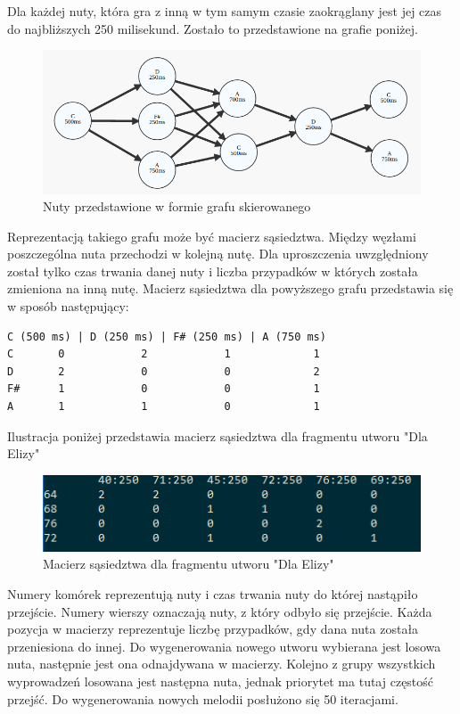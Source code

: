 Dla każdej nuty, która gra z inną  w tym samym czasie zaokrąglany jest jej czas do najbliższych 250 milisekund. Zostało to przedstawione na grafie poniżej. 

\begin{figure}[H]
	\centering
	\includegraphics[width=0.5\linewidth]{graf_nuty}
	\caption{Nuty przedstawione w formie grafu skierowanego}
	\label{fig:grafnuty}
\end{figure}

Reprezentacją takiego grafu może być macierz sąsiedztwa. Między węzłami poszczególna nuta przechodzi w kolejną nutę. Dla uproszczenia uwzględniony został tylko czas trwania danej nuty i liczba przypadków w których została zmieniona na inną nutę. Macierz sąsiedztwa dla powyższego grafu przedstawia się w sposób następujący:

\begin{lstlisting}[caption={Macierz przejść},captionpos=b]
C (500 ms) | D (250 ms) | F# (250 ms) | A (750 ms)
C       0            2            1             1
D       2            0            0             2
F#      1            0            0             1
A       1            1            0             1
\end{lstlisting}

Ilustracja poniżej przedstawia macierz sąsiedztwa dla fragmentu utworu "Dla Elizy"

\begin{figure}[H]
	\centering
	\includegraphics[width=0.7\linewidth]{macierz_dla_elizy}
	\caption{Macierz sąsiedztwa dla fragmentu utworu "Dla Elizy"}
	\label{fig:macierzdlaelizy}
\end{figure}

Numery komórek reprezentują nuty i czas trwania nuty do której nastąpiło przejście. Numery wierszy oznaczają nuty, z który odbyło się przejście. Każda pozycja w macierzy reprezentuje liczbę przypadków, gdy dana nuta została przeniesiona do innej. Do wygenerowania nowego utworu wybierana jest losowa nuta, następnie jest ona odnajdywana w macierzy. Kolejno z grupy wszystkich wyprowadzeń losowana jest następna nuta, jednak priorytet ma tutaj częstość przejść. Do wygenerowania nowych melodii posłużono się 50 iteracjami.

